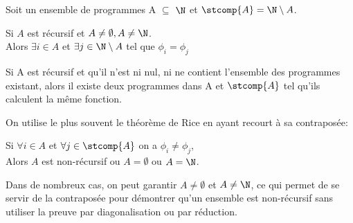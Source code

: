 Soit un ensemble de programmes A $\subseteq$ $\N$ et $\stcomp{A} = \N \setminus A$.

\begin{mytheo}[Rice]
	Si $A$ est récursif et $A\neq \emptyset, A \neq \N$. \\
	Alors $\exists i \in A$ et $\exists j \in \N \setminus A$ tel que $\phi _i = \phi _j$
	
	Si A est récursif et qu'il n'est ni nul, ni ne contient l'ensemble des programmes existant, alors il existe deux programmes dans A et $\stcomp{A}$ tel qu'ils calculent la même fonction. 
\end{mytheo}

On utilise le plus souvent le théorème de Rice en ayant recourt à sa contraposée:

\begin{mytheo}
	Si $\forall  i \in A$ et $\forall j \in \stcomp{A}$ on a $\phi_i \neq \phi_j$, \\
	Alors $A$ est non-récursif ou $A = \emptyset$ ou $A = \N$.
\end{mytheo}

Dans de nombreux cas, on peut garantir $A \neq \emptyset$ et $A \neq \N$, ce qui permet de se servir de la contraposée pour démontrer qu'un ensemble est non-récursif sans utiliser la preuve par diagonalisation ou par réduction.


